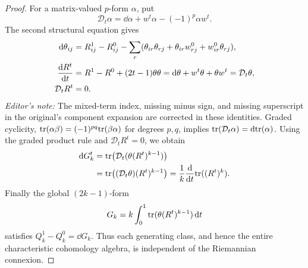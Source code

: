 \documentclass[../main]{subfiles}
\begin{document}
\begin{proof}
For a matrix-valued $p$-form $\alpha$, put
\[\mathcal D_t\alpha=\dd\alpha+w^t\alpha-(-1)^p\alpha w^t.\]
The second structural equation gives
\begin{align*}
\mathrm{d}\theta_{ij}&=R^1_{ij}-R^0_{ij}-\sum_r(\theta_{ir}\theta_{rj}+\theta_{ir}w^0_{rj}+w^0_{ir}\theta_{rj}),\\
\dfrac{\mathrm{d}R^t}{\mathrm{d}t}&=R^1-R^0+(2t-1)\theta\theta
             =\mathrm{d}\theta+w^t\theta+\theta w^t=\mathcal D_t\theta,\\
\mathcal D_tR^t&=0.
\end{align*}
\emph{Editor's note:} The mixed-term index, missing minus sign, and missing superscript in the original's component expansion are corrected in these identities.
Graded cyclicity, $\mathrm{tr}(\alpha\beta)=(-1)^{pq}\mathrm{tr}(\beta\alpha)$ for degrees $p,q$, implies $\mathrm{tr}(\mathcal D_t\alpha)=\mathrm{d}\mathrm{tr}(\alpha)$. Using the graded product rule and $\mathcal D_tR^t=0$, we obtain
\begin{align*}
\dd G_k^t
 &=\tr\bigl(\mathcal D_t(\theta(R^t)^{k-1})\bigr)\\
 &=\tr\bigl((\mathcal D_t\theta)(R^t)^{k-1}\bigr)
 =\frac1k\dv{}{t}\tr((R^t)^k).
\end{align*}
Finally the global $(2k-1)$-form
\[G_k=k\int_0^1\mathrm{tr}(\theta(R^t)^{k-1})\,\mathrm{d}t\]
satisfies $Q_k^1-Q_k^0=\dd G_k$. Thus each generating class, and hence the entire characteristic cohomology algebra, is independent of the Riemannian connexion.
\end{proof}
\end{document}
